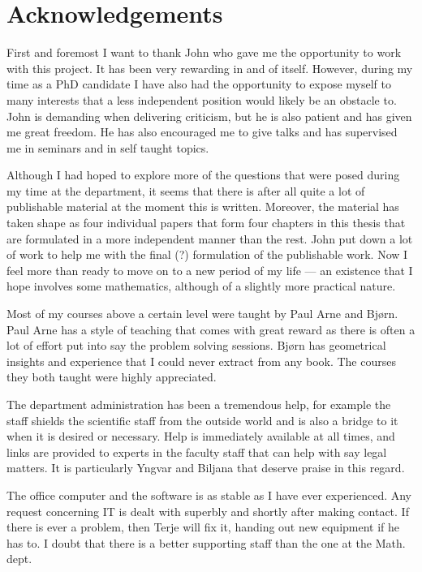 
\chapter{Acknowledgements}

First and foremost I want to thank John who gave me the opportunity to work with this project. It has been very rewarding in and of itself. However, during my time as a PhD candidate I have also had the opportunity to expose myself to many interests that a less independent position would likely be an obstacle to. John is demanding when delivering criticism, but he is also patient and has given me great freedom. He has also encouraged me to give talks and has supervised me in seminars and in self taught topics.

Although I had hoped to explore more of the questions that were posed during my time at the department, it seems that there is after all quite a lot of publishable material at the moment this is written. Moreover, the material has taken shape as four individual papers that form four chapters in this thesis that are formulated in a more independent manner than the rest. John put down a lot of work to help me with the final (?) formulation of the publishable work. Now I feel more than ready to move on to a new period of my life --- an existence that I hope involves some mathematics, although of a slightly more practical nature.

Most of my courses above a certain level were taught by Paul Arne and Bjørn. Paul Arne has a style of teaching that comes with great reward as there is often a lot of effort put into say the problem solving sessions. Bjørn has geometrical insights and experience that I could never extract from any book. The courses they both taught were highly appreciated.

The department administration has been a tremendous help, for example the staff shields the scientific staff from the outside world and is also a bridge to it when it is desired or necessary. Help is immediately available at all times, and links are provided to experts in the faculty staff that can help with say legal matters. It is particularly Yngvar and Biljana that deserve praise in this regard.

The office computer and the software is as stable as I have ever experienced. Any request concerning IT is dealt with superbly and shortly after making contact. If there is ever a problem, then Terje will fix it, handing out new equipment if he has to. I doubt that there is a better supporting staff than the one at the Math. dept.

